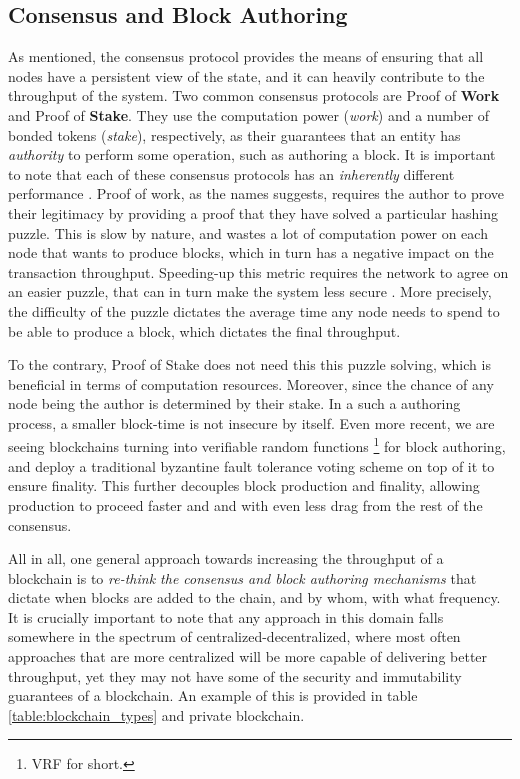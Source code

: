 \subsection{Consensus and Block Authoring}

As mentioned, the consensus protocol provides the means of ensuring that all nodes have a persistent
view of the state, and it can heavily contribute to the throughput of the system. Two common
consensus protocols are Proof of \textbf{Work} and Proof of \textbf{Stake}. They use the computation
power (\textit{work}) and a number of bonded tokens (\textit{stake}), respectively, as their
guarantees that an entity has \textit{authority} to perform some operation, such as authoring a
block. It is important to note that each of these consensus protocols has an \textit{inherently}
different performance \cite{survey_on_all}. Proof of work, as the names suggests, requires the
author to prove their legitimacy by providing a proof that they have solved a particular hashing
puzzle. This is slow by nature, and wastes a lot of computation power on each node that wants to
produce blocks, which in turn has a negative impact on the transaction throughput. Speeding-up this
metric requires the network to agree on an easier puzzle, that can in turn make the system less
secure \cite{security_of_bitcoin}. More precisely, the difficulty of the puzzle dictates the average
time any node needs to spend to be able to produce a block, which dictates the final throughput.

To the contrary, Proof of Stake does not need this this puzzle solving, which is beneficial in terms
of computation resources. Moreover, since the chance of any node being the author is determined by
their stake. In a such a authoring process, a smaller block-time is not insecure by itself. Even
more recent, we are seeing blockchains turning into verifiable random functions
\cite{Dodis_Yampolskiy_2005_VRF}\footnote{VRF for short.} for block authoring, and deploy a
traditional byzantine fault tolerance voting scheme on top of it to ensure finality. This further
decouples block production and finality, allowing production to proceed faster and and with even
less drag from the rest of the consensus.

All in all, one general approach towards increasing the throughput of a blockchain is to
\textit{re-think the consensus and block authoring mechanisms} that dictate when blocks are added to
the chain, and by whom, with what frequency. It is crucially important to note that any approach in
this domain falls somewhere in the spectrum of centralized-decentralized, where most often
approaches that are more centralized will be more capable of delivering better throughput, yet they
may not have some of the security and immutability guarantees of a blockchain. An example of this is
provided in table \ref{table:blockchain_types} and private blockchain.

